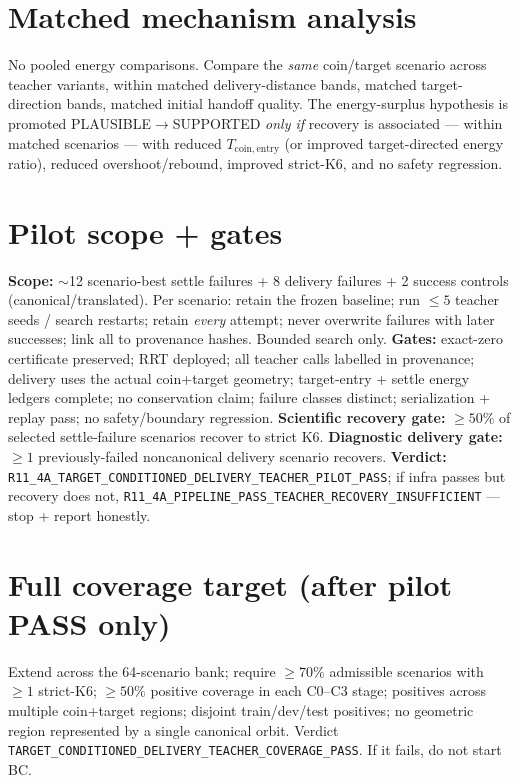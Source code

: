 \documentclass[11pt]{article}
\newcommand{\gate}[1]{\textcolor{blue!55!black}{\texttt{\small #1}}}
\begin{document}
\section{Matched mechanism analysis}
No pooled energy comparisons. Compare the \emph{same} coin/target scenario across teacher variants, within matched
delivery-distance bands, matched target-direction bands, matched initial handoff quality. The energy-surplus hypothesis is
promoted PLAUSIBLE$\to$SUPPORTED \emph{only if} recovery is associated --- within matched scenarios --- with reduced
$T_{\mathrm{coin,entry}}$ (or improved target-directed energy ratio), reduced overshoot/rebound, improved strict-K6, and no
safety regression.

\section{Pilot scope + gates}
\textbf{Scope:} $\sim$12 scenario-best settle failures + 8 delivery failures + 2 success controls (canonical/translated).
Per scenario: retain the frozen baseline; run $\le 5$ teacher seeds / search restarts; retain \emph{every} attempt; never
overwrite failures with later successes; link all to provenance hashes. Bounded search only. \textbf{Gates:} exact-zero
certificate preserved; RRT deployed; all teacher calls labelled in provenance; delivery uses the actual coin+target
geometry; target-entry + settle energy ledgers complete; no conservation claim; failure classes distinct; serialization +
replay pass; no safety/boundary regression. \textbf{Scientific recovery gate:} $\ge 50\%$ of selected settle-failure
scenarios recover to strict K6. \textbf{Diagnostic delivery gate:} $\ge 1$ previously-failed noncanonical delivery
scenario recovers. \textbf{Verdict:} \gate{R11\_4A\_TARGET\_CONDITIONED\_DELIVERY\_TEACHER\_PILOT\_PASS}; if infra passes
but recovery does not, \gate{R11\_4A\_PIPELINE\_PASS\_TEACHER\_RECOVERY\_INSUFFICIENT} --- stop + report honestly.

\section{Full coverage target (after pilot PASS only)}
Extend across the 64-scenario bank; require $\ge 70\%$ admissible scenarios with $\ge 1$ strict-K6; $\ge 50\%$ positive
coverage in each C0--C3 stage; positives across multiple coin+target regions; disjoint train/dev/test positives; no
geometric region represented by a single canonical orbit. Verdict
\gate{TARGET\_CONDITIONED\_DELIVERY\_TEACHER\_COVERAGE\_PASS}. If it fails, do not start BC.
\end{document}
